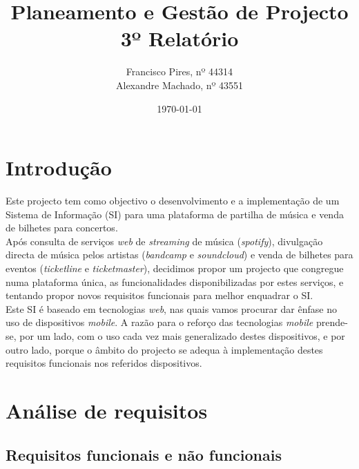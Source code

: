 \documentclass[12pt, a4paper, twoside]{report} %
\begin{document}
\title{%
	\textbf{Planeamento e Gestão de Projecto}\\ 
	\large 3º Relatório
}

\author{%
Francisco Pires, nº 44314 \\
Alexandre Machado, nº 43551 \\
}

\date{\today}
\maketitle
\tableofcontents

\chapter{Introdução}

Este projecto tem como objectivo o desenvolvimento e a implementação de um Sistema de Informação (SI) para uma plataforma de partilha de música e venda de bilhetes para concertos.
\\

\noindent Após consulta de serviços \textit{web} de \textit{streaming} de música (\textit{spotify}), divulgação directa de música pelos artistas (\textit{bandcamp} e \textit{soundcloud}) e venda de bilhetes para eventos (\textit{ticketline} e \textit{ticketmaster}), decidimos propor um projecto que congregue numa plataforma única, as funcionalidades disponibilizadas por estes serviços, e tentando propor novos requisitos funcionais para melhor enquadrar o SI.
\\

\noindent Este SI é baseado em tecnologias \textit{web}, nas quais vamos procurar dar ênfase no uso de dispositivos \textit{mobile}. A razão  para o reforço das tecnologias \textit{mobile} prende-se, por um lado, com o uso cada vez mais generalizado destes dispositivos, e por outro lado, porque o âmbito do projecto se adequa à implementação destes requisitos funcionais nos referidos dispositivos.


\chapter{Análise de requisitos}

\section{Requisitos funcionais e não funcionais}
\end{document}
